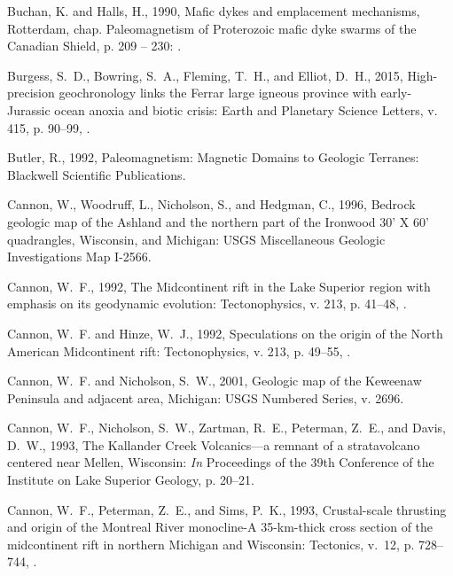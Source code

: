 \documentclass[11pt,letterpaper]{article}
\begin{document}
\begin{thebibliography}{153}
Buchan, K. and Halls, H., 1990, Mafic dykes and emplacement mechanisms,
  Rotterdam, chap. Paleomagnetism of {Proterozoic mafic dyke swarms of the
  Canadian Shield}, p. 209 -- 230: .

Burgess, S.~D., Bowring, S.~A., Fleming, T.~H., and Elliot, D.~H., 2015,
  {High-precision geochronology links the Ferrar large igneous province with
  early-Jurassic ocean anoxia and biotic crisis}: Earth and Planetary Science
  Letters, v. 415, p. 90--99, .

Butler, R., 1992, Paleomagnetism: Magnetic Domains to Geologic Terranes:
  Blackwell Scientific Publications.

Cannon, W., Woodruff, L., Nicholson, S., and Hedgman, C., 1996, {Bedrock
  geologic map of the Ashland and the northern part of the Ironwood 30' X 60'
  quadrangles, Wisconsin, and Michigan}: USGS Miscellaneous Geologic
  Investigations Map I-2566.

Cannon, W.~F., 1992, The {Midcontinent rift in the Lake Superior} region with
  emphasis on its geodynamic evolution: Tectonophysics, v. 213, p. 41--48,
  .

Cannon, W.~F. and Hinze, W.~J., 1992, Speculations on the origin of the {N}orth
  {A}merican {M}idcontinent rift: Tectonophysics, v. 213, p. 49--55,
  .

Cannon, W.~F. and Nicholson, S.~W., 2001, {Geologic map of the Keweenaw
  Peninsula and adjacent area, Michigan}: USGS Numbered Series, v. 2696.

Cannon, W.~F., Nicholson, S.~W., Zartman, R.~E., Peterman, Z.~E., and Davis,
  D.~W., 1993{}, {The Kallander Creek Volcanics---a remnant of a
  stratavolcano centered near Mellen, Wisconsin}: \emph{In} Proceedings of the
  39th Conference of the Institute on Lake Superior Geology, p. 20--21.

Cannon, W.~F., Peterman, Z.~E., and Sims, P.~K., 1993{},
  {Crustal-scale thrusting and origin of the Montreal River monocline-A
  35-km-thick cross section of the midcontinent rift in northern Michigan and
  Wisconsin}: Tectonics, v.~12, p. 728--744, .


\end{thebibliography}
\end{document}
